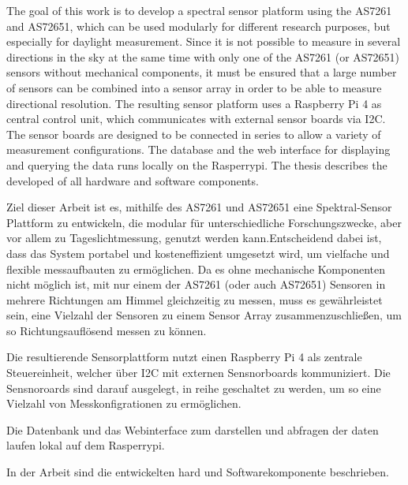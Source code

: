 The goal of this work is to develop a spectral sensor platform using the AS7261 and AS72651, which can be used modularly for different research purposes, but especially for daylight measurement. Since it is not possible to measure in several directions in the sky at the same time with only one of the AS7261 (or AS72651) sensors without mechanical components, it must be ensured that a large number of sensors can be combined into a sensor array in order to be able to measure directional resolution. 
The resulting sensor platform uses a Raspberry Pi 4 as central control unit, which communicates with external sensor boards via I2C.
The sensor boards are designed to be connected in series to allow a variety of measurement configurations.
The database and the web interface for displaying and querying the data runs locally on the Rasperrypi.
The thesis describes the developed of all hardware and software components.


Ziel dieser Arbeit ist es, mithilfe des AS7261 und AS72651 eine Spektral-Sensor Plattform zu entwickeln, die modular für unterschiedliche Forschungszwecke, aber vor allem zu Tageslichtmessung, genutzt werden kann.Entscheidend dabei ist, dass das System portabel und kosteneffizient umgesetzt wird, um vielfache und flexible messaufbauten zu ermöglichen. Da es ohne mechanische Komponenten nicht möglich ist, mit nur einem der AS7261 (oder auch AS72651) Sensoren in mehrere Richtungen am Himmel gleichzeitig zu messen, muss es gewährleistet sein, eine Vielzahl der Sensoren zu einem Sensor Array zusammenzuschließen, um so Richtungsauflösend messen zu können. 

Die resultierende Sensorplattform nutzt einen Raspberry Pi 4 als zentrale Steuereinheit, welcher über I2C mit externen Sensnorboards kommuniziert.
Die Sensnoroards sind darauf ausgelegt, in reihe geschaltet zu werden, um so eine Vielzahl von Messkonfigrationen zu ermöglichen.

Die Datenbank und das Webinterface zum darstellen und abfragen der daten laufen lokal auf dem Rasperrypi.

In der Arbeit sind die entwickelten hard und Softwarekomponente beschrieben.
